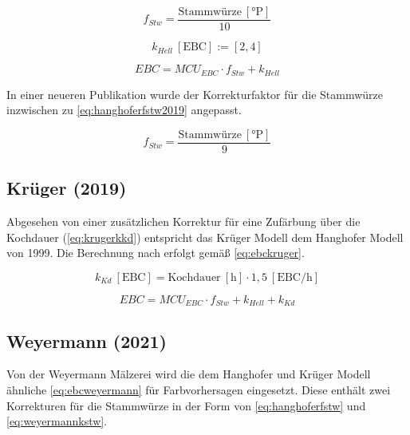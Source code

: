 \documentclass[a4paper,parskip=half]{scrartcl}
\newcommand{\MCUEBC}{\mathit{MCU}_{EBC}}
\newcommand{\EBC}{\mathit{EBC}}
\newcommand{\uebc}{\:[\textrm{EBC}]}
\newcommand{\uebch}{\:[\textrm{EBC/h}]}
\newcommand{\uplato}{\:[\textrm{°P}]}
\newcommand{\fstw}{f_{Stw}}
\newcommand{\khell}{k_{Hell}}
\newcommand{\kkd}{k_{Kd}}
\newcommand{\uhour}{\:[\textrm{h}]}
\begin{document}
\begin{equation}
\fstw = \frac{\text{Stammwürze} \uplato}{10}
\label{eq:hanghoferfstw}
\end{equation}

\begin{equation}
\khell \uebc := \left[2, 4 \right]
\label{eq:hanghoferhell}
\end{equation}

\begin{equation}
\EBC = \MCUEBC \cdot \fstw + \khell
\label{eq:ebchanghofer}
\end{equation}

In einer neueren Publikation wurde der Korrekturfaktor für die Stammwürze inzwischen zu \autoref{eq:hanghoferfstw2019} angepasst. \parencite[78]{Hanghofer2019}

\begin{equation}
\fstw = \frac{\text{Stammwürze} \uplato}{9}
\label{eq:hanghoferfstw2019}
\end{equation}

\subsection*{Krüger (2019)}

Abgesehen von einer zusätzlichen Korrektur für eine Zufärbung über die Kochdauer (\autoref{eq:krugerkkd}) entspricht das Krüger Modell dem Hanghofer Modell von 1999. Die Berechnung nach \textcite{Krueger2019} erfolgt gemäß \autoref{eq:ebckruger}.

\begin{equation}
\kkd \uebc = \text{Kochdauer} \uhour \cdot 1,5 \uebch
\label{eq:krugerkkd}
\end{equation}

\begin{equation}
\EBC = \MCUEBC \cdot \fstw + \khell + \kkd
\label{eq:ebckruger}
\end{equation}

\subsection*{Weyermann (2021)}

Von der Weyermann Mälzerei wird die dem Hanghofer und Krüger Modell ähnliche \autoref{eq:ebcweyermann} für Farbvorhersagen eingesetzt. Diese enthält zwei Korrekturen für die Stammwürze in der Form von \autoref{eq:hanghoferfstw} und \autoref{eq:weyermannkstw}. \parencite{KrausWeyermann2021b}
\end{document}
